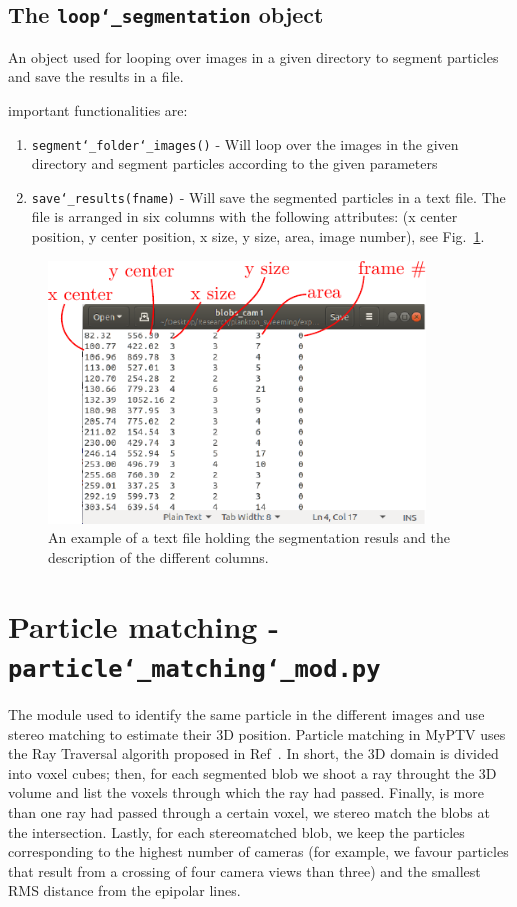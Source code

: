 \documentclass[10pt,a4paper]{article}
\begin{document}
\subsection{The \texttt{loop\char`_segmentation} object} 


An object used for looping over images in a given directory to segment particles
and save the results in a file.


important functionalities are:
%
\begin{enumerate}
	\item \texttt{segment\char`_folder\char`_images()} - Will loop over the images in the given directory and segment particles according to the given parameters
	\item \texttt{save\char`_results(fname)} - Will save the segmented particles in a text file. The file is arranged in six columns with the following attributes: (x center position, y center position, x size, y size, area, image number), see Fig.~\ref{fig:blobfile}.
\end{enumerate}

\begin{figure}[h!]
	\centering
	\includegraphics[width=10cm]{blob_file.pdf}
	\caption{An example of a text file holding the segmentation resuls and the description of the different columns. \label{fig:blobfile}} 
\end{figure}








\section{Particle matching - \texttt{particle\char`_matching\char`_mod.py}}

The module used to identify the same particle in the different images and use stereo matching to estimate their 3D position. Particle matching in MyPTV uses the Ray Traversal algorith proposed in Ref~\cite{Bourgoin2020}. In short, the 3D domain is divided into voxel cubes; then, for each segmented blob we shoot a ray throught the 3D volume and list the voxels through which the ray had passed. Finally, is more than one ray had passed through a certain voxel, we stereo match the blobs at the intersection. Lastly, for each stereomatched blob, we keep the particles corresponding to the highest number of cameras (for example, we favour particles that result from a crossing of four camera views than three) and the smallest RMS distance from the epipolar lines.  
\end{document}
